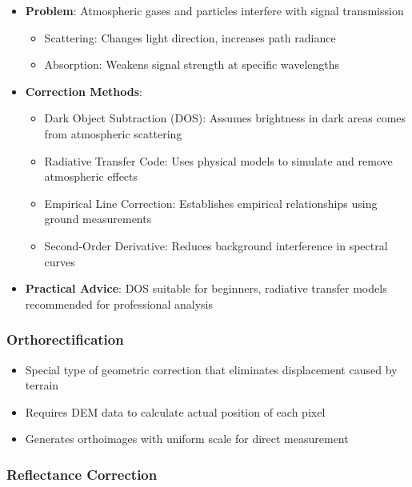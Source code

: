 \documentclass[
  letterpaper,
]{scrbook}
\providecommand{\tightlist}{%
  \setlength{\itemsep}{0pt}\setlength{\parskip}{0pt}}\usepackage{longtable,booktabs,array}
\begin{document}
\begin{itemize}
\tightlist
\item
  \textbf{Problem}: Atmospheric gases and particles interfere with
  signal transmission

  \begin{itemize}
  \tightlist
  \item
    Scattering: Changes light direction, increases path radiance
  \item
    Absorption: Weakens signal strength at specific wavelengths
  \end{itemize}
\item
  \textbf{Correction Methods}:

  \begin{itemize}
  \tightlist
  \item
    Dark Object Subtraction (DOS): Assumes brightness in dark areas
    comes from atmospheric scattering
  \item
    Radiative Transfer Code: Uses physical models to simulate and remove
    atmospheric effects
  \item
    Empirical Line Correction: Establishes empirical relationships using
    ground measurements
  \item
    Second-Order Derivative: Reduces background interference in spectral
    curves
  \end{itemize}
\item
  \textbf{Practical Advice}: DOS suitable for beginners, radiative
  transfer models recommended for professional analysis
\end{itemize}

\subsubsection{Orthorectification}\label{orthorectification}

\begin{itemize}
\tightlist
\item
  Special type of geometric correction that eliminates displacement
  caused by terrain
\item
  Requires DEM data to calculate actual position of each pixel
\item
  Generates orthoimages with uniform scale for direct measurement
\end{itemize}

\subsubsection{Reflectance Correction}\label{reflectance-correction}
\end{document}
